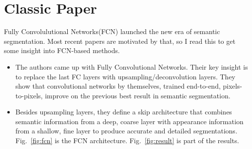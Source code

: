 \documentclass[]{IEEEtran}
\begin{document}
\section{Classic Paper}
	Fully Convolulutional Networks(FCN) launched the new era of semantic segmentation. Most recent papers are motivated by that, so I read this to get some insight into FCN-based methods.
	\begin{itemize}
		\item The authors came up with Fully Convolutional Networks. Their key insight is to replace the last FC layers with upsampling/deconvolution layers. They show that convolutional networks by themselves, trained end-to-end, pixels-to-pixels, improve on the previous best result in semantic segmentation. 
		\item Besides upsampling layers, they define a skip
		architecture that combines semantic information from a deep, coarse layer with appearance information from a shallow, fine layer to produce accurate and detailed segmentations. Fig.~\ref{fig:fcn} is the FCN architecture. Fig.~\ref{fig:result} is part of the results.
	\end{itemize}
\newpage
\end{document}
